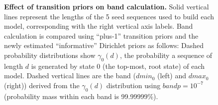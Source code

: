 \documentclass[11pt]{article}
\begin{document}
\begin{figure}
  \begin{center}
    \caption{\textbf{Effect of transition priors on band calculation.}
  Solid vertical lines represent the lengths of the 5
  seed sequences used to build each model, corresponding with the
  right vertical axis labels. Band calculation is compared using
  ``plus-1'' transition priors and the newly estimated ``informative''
  Dirichlet priors as follows: Dashed
  probability distributions show $\gamma_0(d)$, the probability a
  sequence of length $d$ is generated by state $0$ (the top-most, root state)
  of each model. Dashed vertical lines are the band ($dmin_0$ (left) and
  $dmax_0$ (right)) derived from the $\gamma_0(d)$ distribution using $bandp =
  10^{-7}$ (probability mass within each band is 99.99999\%).}
    \label{fig:bands}
  \end{center}
\end{figure}
\end{document}
